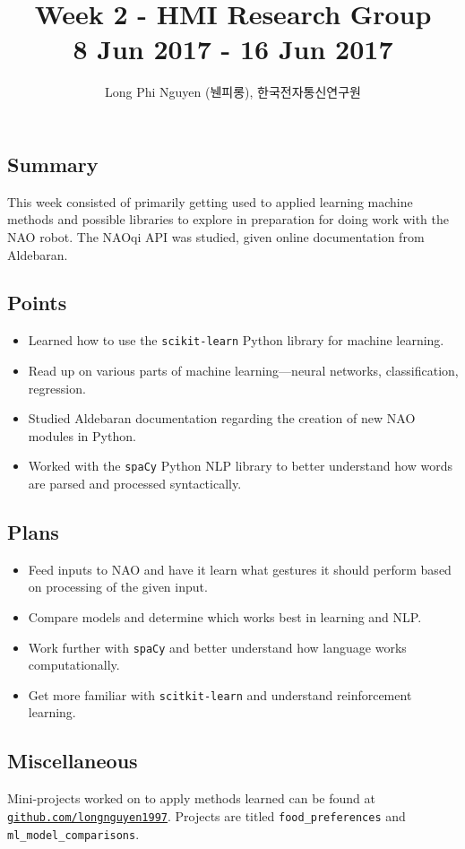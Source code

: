 \documentclass{article}
\title{Week 2 - HMI Research Group \\ \large 8 Jun 2017 - 16 Jun 2017}
\author{Long Phi Nguyen (뉀피롱), 한국전자통신연구원}
\begin{document}
  \maketitle


  \subsection*{Summary} This week consisted of primarily getting used to applied learning machine methods and possible libraries to explore in preparation for doing work with the NAO robot. The NAOqi API was studied, given online documentation from Aldebaran.

  \subsection*{Points}
  \begin{itemize}
    \item Learned how to use the \verb|scikit-learn| Python library for machine learning.
    \item Read up on various parts of machine learning---neural networks, classification, regression.
    \item Studied Aldebaran documentation regarding the creation of new NAO modules in Python.
    \item Worked with the \verb|spaCy| Python NLP library to better understand how words are parsed and processed syntactically.
  \end{itemize}

  \subsection*{Plans}
  \begin{itemize}
    \item Feed inputs to NAO and have it learn what gestures it should perform based on processing of the given input.
    \item Compare models and determine which works best in learning and NLP.
    \item Work further with \verb|spaCy| and better understand how language works computationally.
    \item Get more familiar with \verb|scitkit-learn| and understand reinforcement learning.
  \end{itemize}

  \subsection*{Miscellaneous}
  Mini-projects worked on to apply methods learned can be found at \href{http://github.com/longnguyen1997}{\texttt{github.com/longnguyen1997}}. Projects are titled \verb|food_preferences| and \verb|ml_model_comparisons|.
\end{document}
